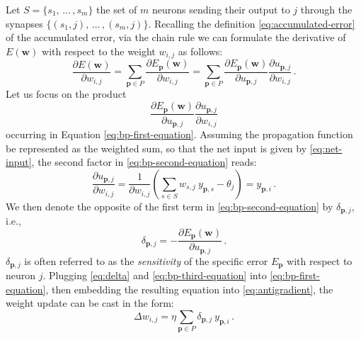 \documentclass[12pt, a4paper, twoside, openright]{report}
\numberwithin{equation}{chapter}
\theoremstyle{theorem}
\theoremstyle{definition}
\theoremstyle{remark}
\theoremstyle{proposition}
\numberwithin{figure}{chapter}
\begin{document}
		Let $S = \big\lbrace s_1, \, \ldots \, , s_m \big\rbrace$ the set of $m$ neurons sending their output to $j$ through the synapses $\big\lbrace (s_1,j), \, \ldots \, , (s_m,j) \big\rbrace$. Recalling the definition \eqref{eq:accumulated-error} of the accumulated error, via the chain rule we can formulate the derivative of $E(\boldsymbol{w})$ with respect to the weight $w_{i,j}$ as follows:
		\begin{equation}
			\label{eq:bp-first-equation}
			\dfrac{\partial E(\boldsymbol{w})}{\partial w_{i,j}} = \sum_{\boldsymbol{p} \in P} \dfrac{\partial E_{\boldsymbol{p}}(\boldsymbol{w})}{\partial w_{i,j}} = \sum_{\boldsymbol{p} \in P} \dfrac{\partial E_{\boldsymbol{p}}(\boldsymbol{w})}{\partial u_{\boldsymbol{p},j}} \dfrac{\partial u_{\boldsymbol{p},j}}{\partial w_{i,j}} \, .
		\end{equation}
		Let us focus on the product
		\begin{equation}
			\label{eq:bp-second-equation}
			\dfrac{\partial E_{\boldsymbol{p}}(\boldsymbol{w})}{\partial u_{\boldsymbol{p},j}} \dfrac{\partial u_{\boldsymbol{p},j}}{\partial w_{i,j}}
		\end{equation}
		occurring in Equation \eqref{eq:bp-first-equation}. Assuming the propagation function be represented as the weighted sum, so that the net input is given by \eqref{eq:net-input}, the second factor in \eqref{eq:bp-second-equation} reads:
		\begin{equation}
			\label{eq:bp-third-equation}
			\dfrac{\partial u_{\boldsymbol{p},j}}{\partial w_{i,j}} = \dfrac{1}{\partial w_{i,j}} \left( \sum_{s \in S} w_{s,j} ~ y_{\boldsymbol{p},s} - \theta_j \right) = y_{\boldsymbol{p},i} \, .
		\end{equation}
		We then denote the opposite of the first term in \eqref{eq:bp-second-equation} by $\delta_{\boldsymbol{p},j}$, i.e.,
		\begin{equation}
			\label{eq:delta}
			\delta_{\boldsymbol{p},j} = - \dfrac{\partial E_{\boldsymbol{p}}(\boldsymbol{w})}{\partial u_{\boldsymbol{p},j}} \, .
		\end{equation} 
		$\delta_{\boldsymbol{p},j}$ is often referred to as the \emph{sensitivity} of the specific error $E_{\boldsymbol{p}}$ with respect to neuron $j$. Plugging \eqref{eq:delta} and \eqref{eq:bp-third-equation} into \eqref{eq:bp-first-equation}, then embedding the resulting equation into \eqref{eq:antigradient}, the weight update can be cast in the form:
		\begin{equation}
			\label{eq:bp-weight-update}
			\Delta w_{i,j} = \eta \sum_{\boldsymbol{p} \in P} \delta_{\boldsymbol{p},j} ~ y_{\boldsymbol{p},i} \, .
		\end{equation}
\end{document}

